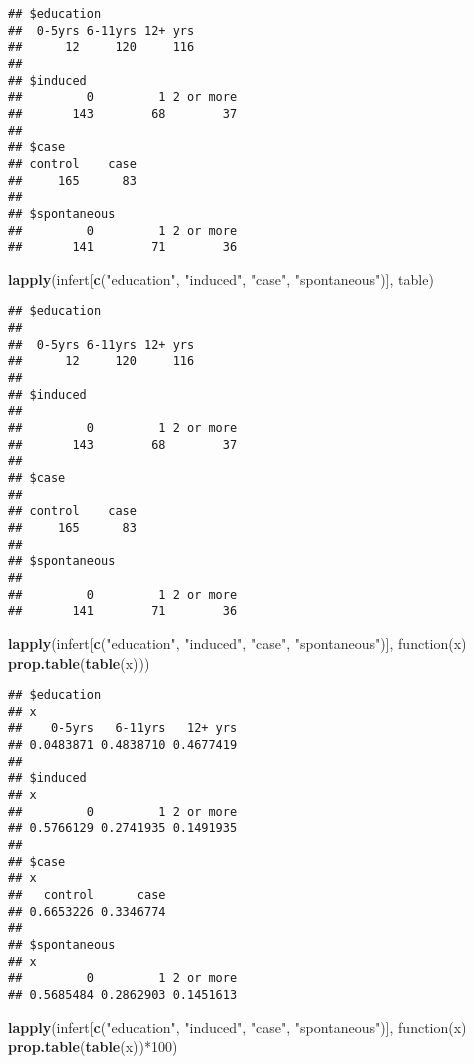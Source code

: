 \documentclass[]{book}
\newenvironment{Shaded}{\begin{snugshade}}{\end{snugshade}}
\newcommand{\KeywordTok}[1]{\textcolor[rgb]{0.13,0.29,0.53}{\textbf{{#1}}}}
\newcommand{\DecValTok}[1]{\textcolor[rgb]{0.00,0.00,0.81}{{#1}}}
\newcommand{\StringTok}[1]{\textcolor[rgb]{0.31,0.60,0.02}{{#1}}}
\newcommand{\NormalTok}[1]{{#1}}
\theoremstyle{definition}
\theoremstyle{definition}
\theoremstyle{remark}
\begin{document}
\begin{verbatim}
## $education
##  0-5yrs 6-11yrs 12+ yrs 
##      12     120     116 
## 
## $induced
##         0         1 2 or more 
##       143        68        37 
## 
## $case
## control    case 
##     165      83 
## 
## $spontaneous
##         0         1 2 or more 
##       141        71        36
\end{verbatim}

\begin{Shaded}
\begin{Highlighting}[]
\KeywordTok{lapply}\NormalTok{(infert[}\KeywordTok{c}\NormalTok{(}\StringTok{"education"}\NormalTok{, }\StringTok{"induced"}\NormalTok{, }\StringTok{"case"}\NormalTok{, }\StringTok{"spontaneous"}\NormalTok{)], table)}
\end{Highlighting}
\end{Shaded}

\begin{verbatim}
## $education
## 
##  0-5yrs 6-11yrs 12+ yrs 
##      12     120     116 
## 
## $induced
## 
##         0         1 2 or more 
##       143        68        37 
## 
## $case
## 
## control    case 
##     165      83 
## 
## $spontaneous
## 
##         0         1 2 or more 
##       141        71        36
\end{verbatim}

\begin{Shaded}
\begin{Highlighting}[]
\KeywordTok{lapply}\NormalTok{(infert[}\KeywordTok{c}\NormalTok{(}\StringTok{"education"}\NormalTok{, }\StringTok{"induced"}\NormalTok{, }\StringTok{"case"}\NormalTok{, }\StringTok{"spontaneous"}\NormalTok{)], }
       \NormalTok{function(x) }\KeywordTok{prop.table}\NormalTok{(}\KeywordTok{table}\NormalTok{(x)))}
\end{Highlighting}
\end{Shaded}

\begin{verbatim}
## $education
## x
##    0-5yrs   6-11yrs   12+ yrs 
## 0.0483871 0.4838710 0.4677419 
## 
## $induced
## x
##         0         1 2 or more 
## 0.5766129 0.2741935 0.1491935 
## 
## $case
## x
##   control      case 
## 0.6653226 0.3346774 
## 
## $spontaneous
## x
##         0         1 2 or more 
## 0.5685484 0.2862903 0.1451613
\end{verbatim}

\begin{Shaded}
\begin{Highlighting}[]
\KeywordTok{lapply}\NormalTok{(infert[}\KeywordTok{c}\NormalTok{(}\StringTok{"education"}\NormalTok{, }\StringTok{"induced"}\NormalTok{, }\StringTok{"case"}\NormalTok{, }\StringTok{"spontaneous"}\NormalTok{)], }
       \NormalTok{function(x) }\KeywordTok{prop.table}\NormalTok{(}\KeywordTok{table}\NormalTok{(x))*}\DecValTok{100}\NormalTok{)}
\end{Highlighting}
\end{Shaded}
\end{document}
